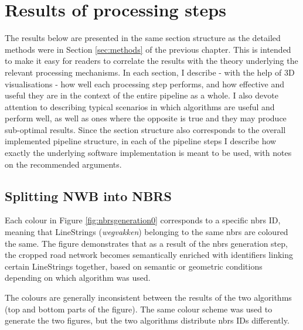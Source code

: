 \section{Results of processing steps}
\label{sec:results}

The results below are presented in the same section structure as the detailed methods were in Section \ref{sec:methods} of the previous chapter. This is intended to make it easy for readers to correlate the results with the theory underlying the relevant processing mechanisms. In each section, I describe - with the help of 3D visualisations - how well each processing step performs, and how effective and useful they are in the context of the entire pipeline as a whole. I also devote attention to describing typical scenarios in which algorithms are useful and perform well, as well as ones where the opposite is true and they may produce sub-optimal results. Since the section structure also corresponds to the overall implemented pipeline structure, in each of the pipeline steps I describe how exactly the underlying software implementation is meant to be used, with notes on the recommended arguments.

\subsection{Splitting NWB into NBRS}
\label{sub:r_nbrsgeneration}

Each colour in Figure \ref{fig:nbrsgeneration0} corresponds to a specific \ac{nbrs} ID, meaning that LineStrings (\textit{wegvakken}) belonging to the same \ac{nbrs} are coloured the same. The figure demonstrates that as a result of the \ac{nbrs} generation step, the cropped road network becomes semantically enriched with identifiers linking certain LineStrings together, based on semantic or geometric conditions depending on which algorithm was used.

The colours are generally inconsistent between the results of the two algorithms (top and bottom parts of the figure). The same colour scheme was used to generate the two figures, but the two algorithms distribute \ac{nbrs} IDs differently.

